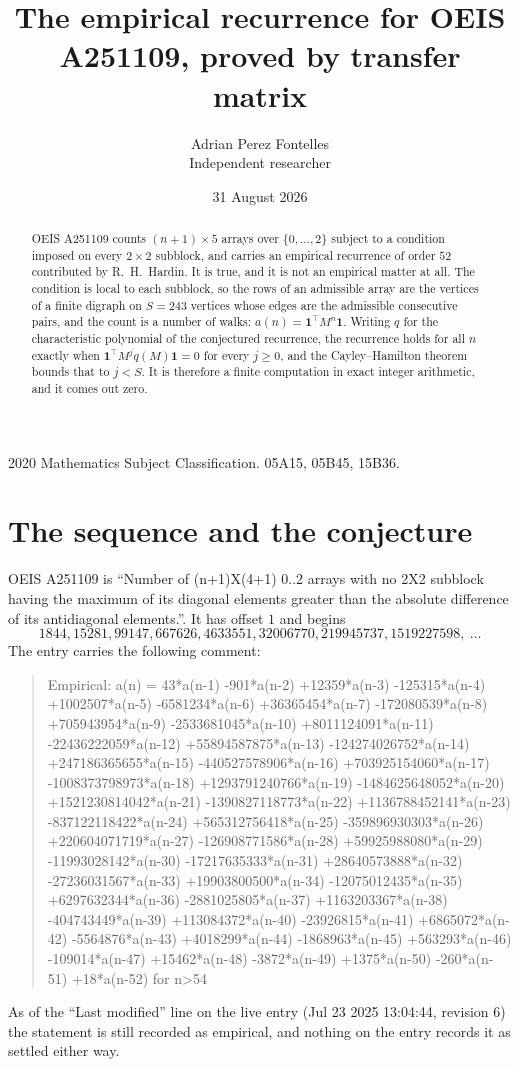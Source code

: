 \documentclass[11pt,a4paper]{article}
\title{The empirical recurrence for OEIS A251109, proved by transfer matrix}
\author{Adrian Perez Fontelles\\ \small Independent researcher}
\date{31 August 2026}
\theoremstyle{plain}
\theoremstyle{definition}
\begin{document}
\maketitle

\begin{abstract}
OEIS A251109 counts $(n+1)\times5$ arrays over $\{0,\dots,2\}$ subject to a condition imposed on
every $2\times2$ subblock, and carries an empirical recurrence of order $52$ contributed
by R.~H.~Hardin. It is true, and it is not an empirical matter at all. The condition is local
to each subblock, so the rows of an admissible array are the vertices of a finite digraph
on $S=243$ vertices whose edges are the admissible consecutive pairs, and the count is a
number of walks: $a(n)=\mathbf{1}^{\!\top}M^{n}\mathbf{1}$. Writing $q$
for the characteristic polynomial of the conjectured recurrence, the recurrence holds for all
$n$ exactly when $\mathbf{1}^{\!\top}M^{j}q(M)\mathbf{1}=0$ for every $j\ge0$, and the
Cayley--Hamilton theorem bounds that to $j<S$. It is therefore a finite computation in exact
integer arithmetic, and it comes out zero.
\end{abstract}

\noindent\small 2020 Mathematics Subject Classification. 05A15, 05B45, 15B36.\normalsize

\section{The sequence and the conjecture}

OEIS A251109 is ``Number of (n+1)X(4+1) 0..2 arrays with no 2X2 subblock having the maximum of its diagonal elements greater than the absolute difference of its antidiagonal elements.''. It has offset $1$ and begins
\[
1844, 15281, 99147, 667626, 4633551, 32006770, 219945737, 1519227598,\ \dots
\]
The entry carries the following comment:
\begin{quote}\small
Empirical: a(n) = 43*a(n-1) -901*a(n-2) +12359*a(n-3) -125315*a(n-4) +1002507*a(n-5) -6581234*a(n-6) +36365454*a(n-7) -172080539*a(n-8) +705943954*a(n-9) -2533681045*a(n-10) +8011124091*a(n-11) -22436222059*a(n-12) +55894587875*a(n-13) -124274026752*a(n-14) +247186365655*a(n-15) -440527578906*a(n-16) +703925154060*a(n-17) -1008373798973*a(n-18) +1293791240766*a(n-19) -1484625648052*a(n-20) +1521230814042*a(n-21) -1390827118773*a(n-22) +1136788452141*a(n-23) -837122118422*a(n-24) +565312756418*a(n-25) -359896930303*a(n-26) +220604071719*a(n-27) -126908771586*a(n-28) +59925988080*a(n-29) -11993028142*a(n-30) -17217635333*a(n-31) +28640573888*a(n-32) -27236031567*a(n-33) +19903800500*a(n-34) -12075012435*a(n-35) +6297632344*a(n-36) -2881025805*a(n-37) +1163203367*a(n-38) -404743449*a(n-39) +113084372*a(n-40) -23926815*a(n-41) +6865072*a(n-42) -5564876*a(n-43) +4018299*a(n-44) -1868963*a(n-45) +563293*a(n-46) -109014*a(n-47) +15462*a(n-48) -3872*a(n-49) +1375*a(n-50) -260*a(n-51) +18*a(n-52) for n>54
\end{quote}
As of the ``Last modified'' line on the live entry (Jul 23 2025 13:04:44, revision 6) the statement is
still recorded as empirical, and nothing on the entry records it as settled either way.
\end{document}
